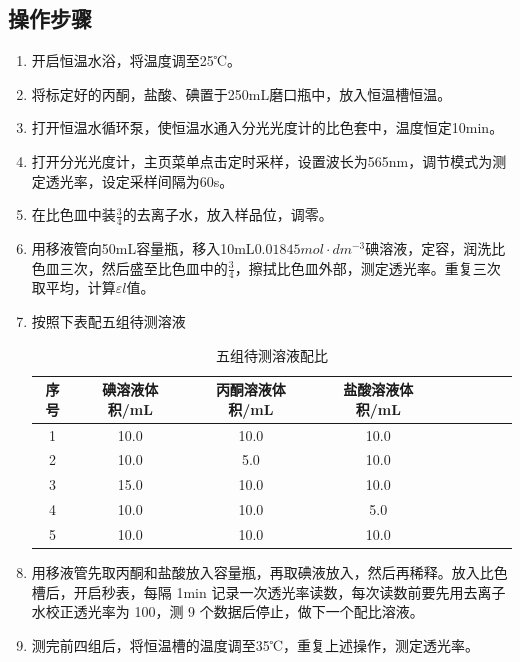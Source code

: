 \documentclass[hyperref,a4paper,UTF8]{ctexart}
\begin{document}
\subsection{操作步骤}
\begin{enumerate}
\item 开启恒温水浴，将温度调至25℃。
\item 将标定好的丙酮，盐酸、碘置于250mL磨口瓶中，放入恒温槽恒温。
\item 打开恒温水循环泵，使恒温水通入分光光度计的比色套中，温度恒定10min。
\item 打开分光光度计，主页菜单点击定时采样，设置波长为565nm，调节模式为测定透光率，设定采样间隔为60s。
\item 在比色皿中装$\frac{3}{4}$的去离子水，放入样品位，调零。
\item 用移液管向50mL容量瓶，移入10mL$0.01845mol·dm^{-3}$碘溶液，定容，润洗比色皿三次，然后盛至比色皿中的$\frac{3}{4}$，擦拭比色皿外部，测定透光率。重复三次取平均，计算$\varepsilon l$值。
\item 按照下表配五组待测溶液
\begin{table}[!htbp]
\centering
\caption{五组待测溶液配比}
\label{配比}
\begin{tabular}{|c|c|c|c|c|c|c|c|c|}
\hline
序号&碘溶液体积/mL&丙酮溶液体积/mL&盐酸溶液体积/mL\\
\hline
1&10.0 &10.0 &10.0\\
\hline
2&10.0 &5.0 &10.0\\
\hline
3&15.0 &10.0 &10.0\\
\hline
4&10.0 &10.0 &5.0\\
\hline
5&10.0 &10.0 &10.0\\
\hline
\end{tabular}
\end{table}
\item 用移液管先取丙酮和盐酸放入容量瓶，再取碘液放入，然后再稀释。放入比色槽后，开启秒表，每隔 1min 记录一次透光率读数，每次读数前要先用去离子水校正透光率为 100，测 9 个数据后停止，做下一个配比溶液。
\item 测完前四组后，将恒温槽的温度调至35℃，重复上述操作，测定透光率。

\end{enumerate}
\end{document}
